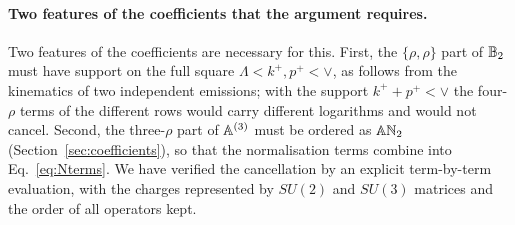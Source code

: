 \paragraph{Two features of the coefficients that the argument requires.} Two features of the coefficients are necessary for this. First, the $\{\rho,\rho\}$ part of $\mathbb{B}_2$ must have support on the full square $\Lambda<k^+,p^+<\vee$, as follows from the kinematics of two independent emissions; with the support $k^++p^+<\vee$ the four-$\rho$ terms of the different rows would carry different logarithms and would not cancel. Second, the three-$\rho$ part of $\mathbb{A}^{(3)}$ must be ordered as $\mathbb{A}\mathbb{N}_2$ (Section~\ref{sec:coefficients}), so that the normalisation terms combine into Eq.~\eqref{eq:Nterms}. We have verified the cancellation by an explicit term-by-term evaluation, with the charges represented by $SU(2)$ and $SU(3)$ matrices and the order of all operators kept.

